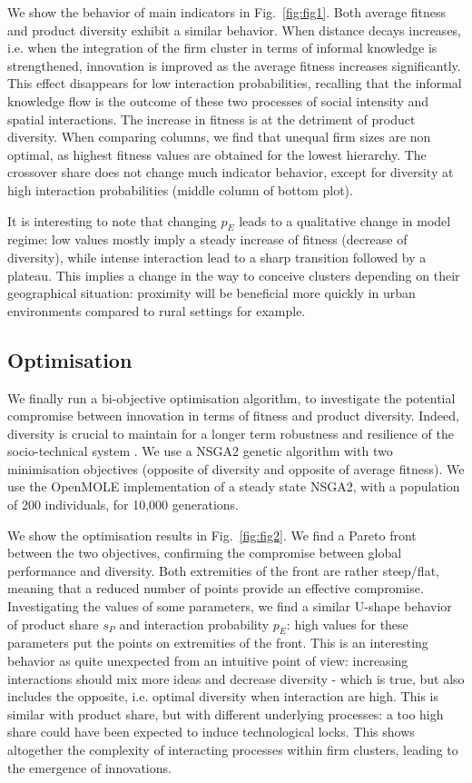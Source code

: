 \documentclass[letterpaper]{article}
\begin{document}
We show the behavior of main indicators in Fig.~\ref{fig:fig1}. Both average fitness and product diversity exhibit a similar behavior. When distance decays increases, i.e. when the integration of the firm cluster in terms of informal knowledge is strengthened, innovation is improved as the average fitness increases significantly. This effect disappears for low interaction probabilities, recalling that the informal knowledge flow is the outcome of these two processes of social intensity and spatial interactions. The increase in fitness is at the detriment of product diversity. When comparing columns, we find that unequal firm sizes are non optimal, as highest fitness values are obtained for the lowest hierarchy. The crossover share does not change much indicator behavior, except for diversity at high interaction probabilities (middle column of bottom plot).

It is interesting to note that changing $p_E$ leads to a qualitative change in model regime: low values mostly imply a steady increase of fitness (decrease of diversity), while intense interaction lead to a sharp transition followed by a plateau. This implies a change in the way to conceive clusters depending on their geographical situation: proximity will be beneficial more quickly in urban environments compared to rural settings for example.




\subsection{Optimisation}

We finally run a bi-objective optimisation algorithm, to investigate the potential compromise between innovation in terms of fitness and product diversity. Indeed, diversity is crucial to maintain for a longer term robustness and resilience of the socio-technical system \citep{reinmoeller2005link}. We use a NSGA2 genetic algorithm with two minimisation objectives (opposite of diversity and opposite of average fitness). We use the OpenMOLE implementation of a steady state NSGA2, with a population of 200 individuals, for 10,000 generations.

We show the optimisation results in Fig.~\ref{fig:fig2}. We find a Pareto front between the two objectives, confirming the compromise between global performance and diversity. Both extremities of the front are rather steep/flat, meaning that a reduced number of points provide an effective compromise. Investigating the values of some parameters, we find a similar U-shape behavior of product share $s_P$ and interaction probability $p_E$: high values for these parameters put the points on extremities of the front. This is an interesting behavior as quite unexpected from an intuitive point of view: increasing interactions should mix more ideas and decrease diversity - which is true, but also includes the opposite, i.e. optimal diversity when interaction are high. This is similar with product share, but with different underlying processes: a too high share could have been expected to induce technological locks. This shows altogether the complexity of interacting processes within firm clusters, leading to the emergence of innovations.
\end{document}
